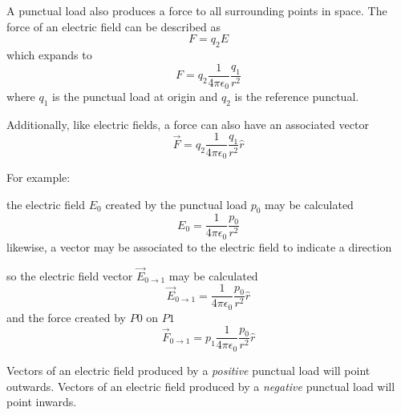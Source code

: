 \documentclass{article}
\begin{document}
A punctual load also produces a force to all surrounding points in space. The force of an electric
field can be described as
\[
	F = q_2 E
\]
which expands to
\[
	F = q_2 \frac{1}{4 \pi \epsilon_0} \frac{q_1}{r^2}
\]
where $q_1$ is the punctual load at origin and $q_2$ is the reference punctual.

Additionally, like electric fields, a force can also have an associated vector
\[
	\vec{F} = q_2 \frac{1}{4 \pi \epsilon_0} \frac{q_1}{r^2}\hat{r}
\]

\pagebreak
For example:
\begin{center}
\end{center}
the electric field $E_0$ created by the punctual load $p_0$ may be calculated
\[
	E_0 = \frac{1}{4 \pi \epsilon_0} \frac{p_0}{r^2}
\]
likewise, a vector may be associated to the electric field to indicate a direction
\begin{center}
\end{center}
so the electric field vector $\vec{E}_{0 \to 1}$ may be calculated
\[
	\vec{E}_{0 \to 1} = \frac{1}{4 \pi \epsilon_0} \frac{p_0}{r^2}\hat{r}
\]
and the force created by $P0$ on $P1$
\[
	\vec{F}_{0 \to 1} = p_1 \frac{1}{4 \pi \epsilon_0} \frac{p_0}{r^2}\hat{r}
\]

Vectors of an electric field produced by a \emph{positive} punctual load will point outwards. Vectors of an electric field produced by a \emph{negative} punctual load will point inwards.
\end{document}
